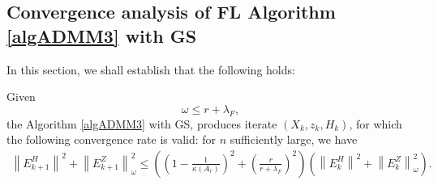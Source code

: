 \subsection{Convergence analysis of FL Algorithm \ref{algADMM3} with GS} 
In this section, we shall establish that the following holds: 
\begin{theorem}\label{main:theorem10} 
Given 
\begin{equation}
\omega \leq r + \lambda_F, 
\end{equation}
the Algorithm \ref{algADMM3} with GS, produces iterate $(X_k, z_k, H_k)$, for which the following convergence rate is valid: for $n$ sufficiently large, we have 
\begin{eqnarray*}
\left \|E_{k+1}^H \right \|^2 + \left \|E_{k+1}^Z \right \|_\omega^2 \leq \left ( \left ( 1 - \frac{1}{\kappa(A_r)} \right )^2 + \left ( \frac{r}{r+\lambda_F} \right )^2 \right ) \left (\left \|E_{k}^H \right \|^2 + \left \|E_{k}^Z \right \|_\omega^2 \right ). 
\end{eqnarray*}
\end{theorem}
